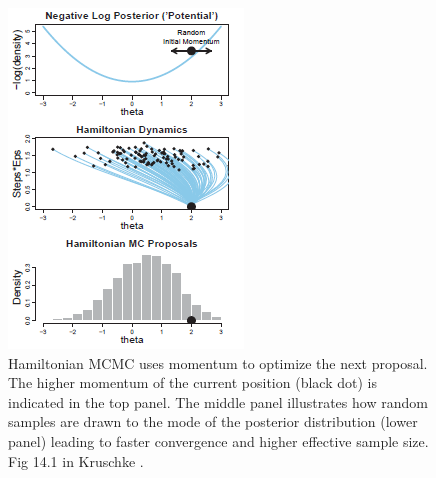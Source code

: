 \documentclass[11pt,notitlepage]{article}
\begin{document}
\begin{figure}
 \vspace{-90pt}
 \includegraphics[scale=1]{Figures/Hamiltonian.png}
  \vspace{-30pt}
  \caption{\footnotesize Hamiltonian MCMC uses momentum to optimize the next proposal. The higher momentum of the current position (black dot) is indicated in the top panel. The middle panel illustrates how random samples are drawn to the mode of the posterior distribution (lower panel) leading to faster convergence and higher effective sample size. Fig 14.1 in Kruschke \cite{Kruschke_Book_2014}.}
    \label{fig:Hamiltonian}
 \vspace{- 10 pt}
\end{figure}
\end{document}
